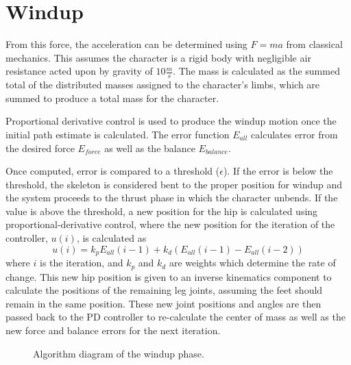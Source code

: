\section{Windup}
From this force, the acceleration can be determined using $F=ma$ from classical mechanics.  This assumes the character is a rigid body with negligible air resistance acted upon by gravity of $10\frac{m}{s}$.  The mass is calculated as the summed total of the distributed masses assigned to the character's limbs, which are summed to produce a total mass for the character.

Proportional derivative control is used to produce the windup motion once the initial path estimate is calculated.  The error function $E_{all}$ calculates error from the desired force $E_{force}$ as well as the balance $E_{balance}$.

Once computed, error is compared to a threshold ($\epsilon$).  If the error is below the threshold, the skeleton is considered bent to the proper position for windup and the system proceeds to the thrust phase in which the character unbends.  If the value is above the threshold, a new position for the hip is calculated using proportional-derivative control, where the new position for the iteration of the controller, $u(i)$, is calculated as \[u(i) = k_p E_{all}(i - 1) + k_d(E_{all}(i-1) - E_{all}(i-2))\] where $i$ is the iteration, and $k_p$ and $k_d$ are weights which determine the rate of change. This new hip position is given to an inverse kinematics component to calculate the positions of the remaining leg joints, assuming the feet should remain in the same position.  These new joint positions and angles are then passed back to the PD controller to re-calculate the center of mass as well as the new force and balance errors for the next iteration.

\begin{figure}[ht]
	\label{fig:bendPhase}
	\centering
	\resizebox{\textwidth}{!}{
		
	}
	\caption{Algorithm diagram of the windup phase.}
\end{figure}

